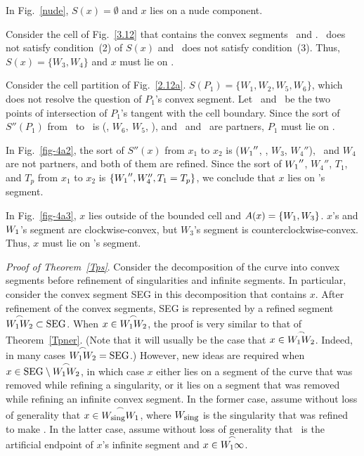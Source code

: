 \begin{example}
{\rm 
In Fig.~\ref{nude}, $S(x) = \emptyset$ and $x$ lies on a nude component.

Consider the cell of Fig.~\ref{3.12} that contains the convex segments 
\wwa\ and .
\wo\ does not satisfy condition~(2) of $S(x)$ and \wt\ does not satisfy condition~(3).
Thus, $S(x) = \{W_{3},W_{4}\}$ and $x$ must lie on .

Consider the cell partition of Fig.~\ref{2.12a}.
$S(P_{1}) = \{W_{1},W_{2},W_{5},W_{6}\}$, which does not resolve the question
of $P_{1}$'s convex segment.
Let \xo\ and \xt\ be the two points of intersection of $P_{1}$'s tangent
with the cell boundary.
Since the sort of $S''(P_{1})$ from \xo\ to \xt\ is (\wo, $W_{6},\ W_{5}$, \wt),
and \wo\ and \wt\ are partners, $P_{1}$ must lie on \wwa.

In Fig.~\ref{fig-4a2}, the sort of $S''(x)$ from $x_{1}$ to $x_{2}$ is ($\mbox{$W_{1}$}''$,
\wt, $W_{3}$, $W_{4}''$), \wo\ and $W_{4}$ are not partners,
and both of them are refined. 
Since the sort of $\mbox{$W_{1}$}''$, $W_{4}''$, $T_{1}$, and $T_{p}$ from $x_{1}$ to
$x_{2}$ is $\{\mbox{$W_{1}$}'',W_{4}'',T_{1} = T_{p}\}$, we conclude that $x$ lies on \wo's segment.

In Fig.~\ref{fig-4a3}, $x$ lies outside of the bounded cell and
$A(x) = \{\mbox{$W_{1}$},W_{3}\}$.
$x$'s and $\mbox{$W_{1}$}$'s segment are
clockwise-convex, but $W_{3}$'s segment is counterclockwise-convex.
Thus, $x$ must lie on \wo's segment.
}
\end{example}
%
\par{\it Proof of Theorem~\ref{Tps}}. \ignorespaces
Consider the decomposition of the curve into convex segments before refinement
of singularities and infinite segments.
In particular, consider the convex segment SEG in this decomposition that contains $x$.
After refinement of the convex segments, SEG is represented by a refined segment
$\mbox{$\stackrel{\frown}{\mbox{$W_{1}$}\mbox{$W_{2}$}}$} \subset \mbox{SEG}$.
When $x \in  \mbox{$\stackrel{\frown}{\mbox{$W_{1}$}\mbox{$W_{2}$}}$}$, the proof is very similar to that of Theorem~\ref{Tpner}.
(Note that it will usually be the case that $x \in  \mbox{$\stackrel{\frown}{\mbox{$W_{1}$}\mbox{$W_{2}$}}$}$.
Indeed, in many cases $\mbox{$\stackrel{\frown}{\mbox{$W_{1}$}\mbox{$W_{2}$}}$} = \mbox{SEG}$.)
However, new ideas are required when $x \in \mbox{SEG} \setminus \mbox{$\stackrel{\frown}{\mbox{$W_{1}$}\mbox{$W_{2}$}}$}$, 
in which case
$x$ either lies on a segment of the curve that was removed while refining a singularity,
or it lies on a segment that was removed while refining an infinite convex segment.
In the former case, 
assume without loss of generality that $x \in \mbox{$\stackrel{\frown}{W_{\mbox{\footnotesize{sing}}}\mbox{$W_{1}$}}$}$,
where $W_{\mbox{\footnotesize{sing}}}$ is the singularity that was refined to make \wo.
In the latter case, assume without loss of generality that \wo\ is the artificial endpoint
of $x$'s infinite segment and $x \in \mbox{$\stackrel{\frown}{\mbox{$W_{1}$}\infty}$}$.

